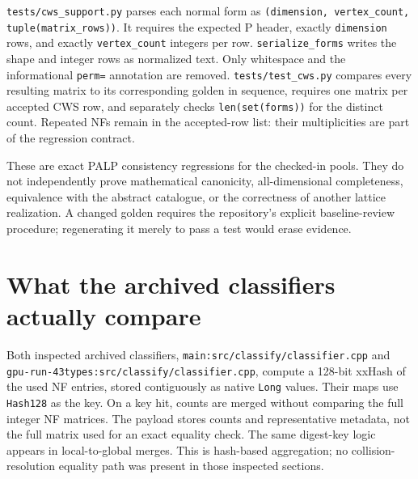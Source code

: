 \documentclass[11pt,a4paper,oneside]{report}
\begin{document}
\texttt{tests/\allowbreak{}cws\_\allowbreak{}support.\allowbreak{}py}
parses each normal form as
\texttt{(\allowbreak{}dimensio\allowbreak{}n,\allowbreak{} vertex\_\allowbreak{}count,\allowbreak{} tuple(\allowbreak{}matrix\_\allowbreak{}rows)\allowbreak{})}.
It requires the expected P header, exactly
\texttt{dimensio\allowbreak{}n} rows, and exactly
\texttt{vertex\_\allowbreak{}count} integers per row.
\texttt{serializ\allowbreak{}e\_\allowbreak{}forms} writes the shape and
integer rows as normalized text. Only whitespace and the informational
\texttt{perm=} annotation are removed.
\texttt{tests/\allowbreak{}test\_\allowbreak{}cws.\allowbreak{}py}
compares every resulting matrix to its corresponding golden in sequence,
requires one matrix per accepted CWS row, and separately checks
\texttt{len(\allowbreak{}set(\allowbreak{}forms)\allowbreak{})} for the
distinct count. Repeated NFs remain in the accepted-row list: their
multiplicities are part of the regression contract.

These are exact PALP consistency regressions for the checked-in pools.
They do not independently prove mathematical canonicity, all-dimensional
completeness, equivalence with the abstract catalogue, or the
correctness of another lattice realization. A changed golden requires
the repository's explicit baseline-review procedure; regenerating it
merely to pass a test would erase evidence.

\section{What the archived classifiers actually
compare}\label{normal-forms-and-classification--what-the-archived-classifiers-actually-compare}

Both inspected archived classifiers,
\texttt{main:\allowbreak{}src/\allowbreak{}classify\allowbreak{}/\allowbreak{}classifi\allowbreak{}er.\allowbreak{}cpp}
and
\texttt{gpu-\allowbreak{}run-\allowbreak{}43types:\allowbreak{}src/\allowbreak{}classify\allowbreak{}/\allowbreak{}classifi\allowbreak{}er.\allowbreak{}cpp},
compute a 128-bit xxHash of the used NF entries, stored contiguously as
native \texttt{Long} values. Their maps use \texttt{Hash128} as the key.
On a key hit, counts are merged without comparing the full integer NF
matrices. The payload stores counts and representative metadata, not the
full matrix used for an exact equality check. The same digest-key logic
appears in local-to-global merges. This is hash-based aggregation; no
collision-resolution equality path was present in those inspected
sections.
\end{document}
